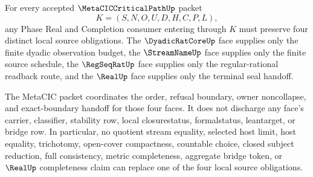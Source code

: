 \begin{theorem}
\label{thm:metacic-critical-path-l10-four-face-source-discipline}
For every accepted $\MetaCICCriticalPathUp$ packet
$$
K=(S,N,O,U,D,H,C,P,L),
$$
any Phase Real and Completion consumer entering through $K$ must preserve four distinct local source obligations. The $\DyadicRatCoreUp$ face supplies only the finite dyadic observation budget, the $\StreamNameUp$ face supplies only the finite source schedule, the $\RegSeqRatUp$ face supplies only the regular-rational readback route, and the $\RealUp$ face supplies only the terminal seal handoff.

The MetaCIC packet coordinates the order, refusal boundary, owner noncollapse, and exact-boundary handoff for those four faces. It does not discharge any face's carrier, classifier, stability row, local closurestatus, formalstatus, leantarget, or bridge row. In particular, no quotient stream equality, selected host limit, host equality, trichotomy, open-cover compactness, countable choice, closed subject reduction, full consistency, metric completeness, aggregate bridge token, or $\RealUp$ completeness claim can replace one of the four local source obligations.
\end{theorem}
